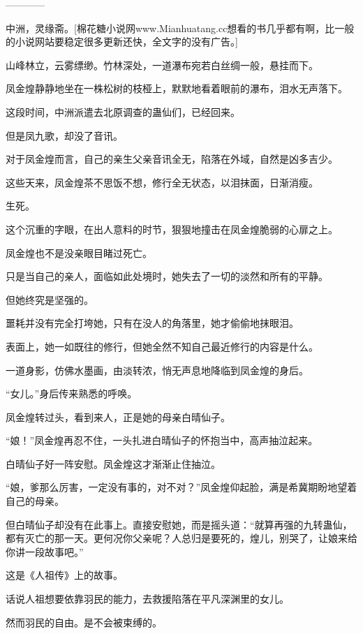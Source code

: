 
\begin{this_body}

------------

中洲，灵缘斋。[棉花糖小说网www.Mianhuatang.cc想看的书几乎都有啊，比一般的小说网站要稳定很多更新还快，全文字的没有广告。]

山峰林立，云雾缥缈。竹林深处，一道瀑布宛若白丝绸一般，悬挂而下。

凤金煌静静地坐在一株松树的枝桠上，默默地看着眼前的瀑布，泪水无声落下。

这段时间，中洲派遣去北原调查的蛊仙们，已经回来。

但是凤九歌，却没了音讯。

对于凤金煌而言，自己的亲生父亲音讯全无，陷落在外域，自然是凶多吉少。

这些天来，凤金煌茶不思饭不想，修行全无状态，以泪抹面，日渐消瘦。

生死。

这个沉重的字眼，在出人意料的时节，狠狠地撞击在凤金煌脆弱的心扉之上。

凤金煌也不是没亲眼目睹过死亡。

只是当自己的亲人，面临如此处境时，她失去了一切的淡然和所有的平静。

但她终究是坚强的。

噩耗并没有完全打垮她，只有在没人的角落里，她才偷偷地抹眼泪。

表面上，她一如既往的修行，但她全然不知自己最近修行的内容是什么。

一道身影，仿佛水墨画，由淡转浓，悄无声息地降临到凤金煌的身后。

“女儿。”身后传来熟悉的呼唤。

凤金煌转过头，看到来人，正是她的母亲白晴仙子。

“娘！”凤金煌再忍不住，一头扎进白晴仙子的怀抱当中，高声抽泣起来。

白晴仙子好一阵安慰。凤金煌这才渐渐止住抽泣。

“娘，爹那么厉害，一定没有事的，对不对？”凤金煌仰起脸，满是希冀期盼地望着自己的母亲。

但白晴仙子却没有在此事上。直接安慰她，而是摇头道：“就算再强的九转蛊仙，都有灭亡的那一天。更何况你父亲呢？人总归是要死的，煌儿，别哭了，让娘来给你讲一段故事吧。”

这是《人祖传》上的故事。

话说人祖想要依靠羽民的能力，去救援陷落在平凡深渊里的女儿。

然而羽民的自由。是不会被束缚的。


\end{this_body}
